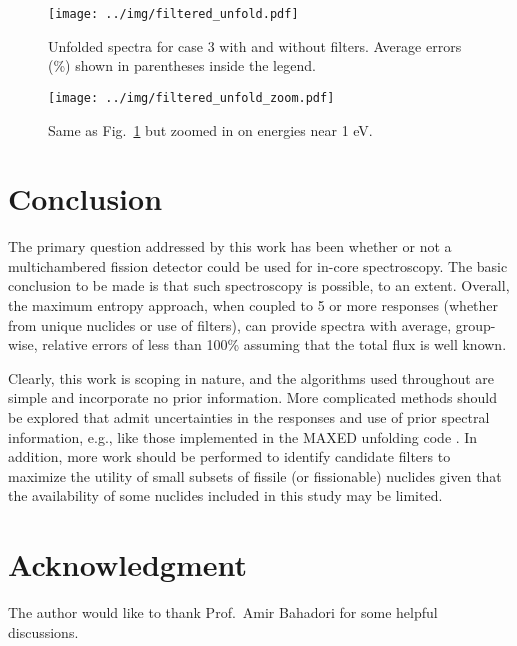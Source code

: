 \documentclass[journal]{IEEEtran}
\newcommand{\FIG}[1]{Fig.~\ref{#1}}               %
\begin{document}
\begin{figure}[h!tb]
  \centering
  \texttt{[image: ../img/filtered\_unfold.pdf]}
  \caption{Unfolded spectra for case 3 with and without filters.   Average  errors (\%) shown in parentheses inside the legend.}
  \label{fig:filtered_unfold}
\end{figure}

\begin{figure}[h!tb]
  \centering
  \texttt{[image: ../img/filtered\_unfold\_zoom.pdf]}
  \caption{Same as \FIG{fig:filtered_unfold} but zoomed in on energies near 1 eV.}
  \label{fig:filtered_unfold_zoom}
\end{figure}


\section{Conclusion}

The primary question addressed by this work has been whether or not a multichambered fission detector could be used for in-core spectroscopy.  The basic conclusion to be made is that such spectroscopy is possible, to an extent.  Overall, the maximum entropy approach, when coupled to 5 or more responses (whether from unique nuclides or use of filters), can provide spectra with average, group-wise, relative errors of less than 100\% assuming that the total flux is well known.  

Clearly, this work is scoping in nature, and the algorithms used throughout are simple and incorporate no prior information.  More complicated methods should be explored that admit uncertainties in the responses and use of prior spectral information, e.g., like those implemented in the MAXED unfolding code \cite{reginatto1999maxed, reginatto2002spectrum}.  In addition, more work should be performed to identify candidate filters to maximize the utility of small subsets of fissile (or fissionable) nuclides given that the availability of some nuclides included in this study may be limited.  



 
\section*{Acknowledgment}


The author would like to thank Prof.~Amir Bahadori for some helpful discussions.


\ifCLASSOPTIONcaptionsoff
  \newpage
\fi
\end{document}
